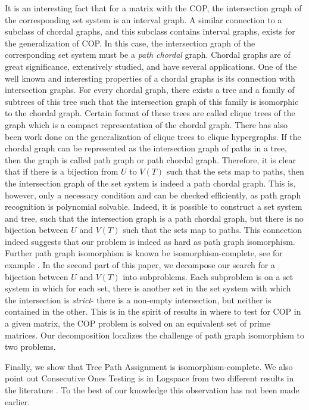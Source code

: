 \documentclass{llncs}
\begin{document}
\noindent
It is an interesting fact that for a matrix with the COP, the intersection graph of the corresponding set system is
an interval graph.  A similar connection to a subclass of chordal graphs, and this subclass contains interval graphs, exists for the generalization of COP.  In this case, the intersection graph of the corresponding set system must be a
{\em path chordal} graph. Chordal
graphs are of great significance, extensively studied, and have several applications.
 One of
the well known and interesting properties of a chordal graphs is its
connection with intersection graphs\cite{mcg04}. For every chordal
graph, there exists a tree and a family of subtrees of this tree such
that the intersection graph of this family is isomorphic to the
chordal graph\cite{plr70,gav78,bp93}.  Certain format of these trees are called clique
trees\cite{apy92} of the graph which is a compact representation of the
chordal graph. There has also been work done on the generalization of
clique trees to clique hypergraphs\cite{km02}.  If the chordal graph can be represented as
the intersection graph of paths in a tree, then the graph is called  path graph\cite{mcg04} or path
chordal graph.  Therefore, it is clear that if there is a bijection from $U$ to $V(T)$ such that
the sets map to paths, then the intersection graph of the set system is indeed a path chordal graph.
This is, however, only a necessary condition and can be checked efficiently, as  path graph recognition is polynomial
solvable\cite{gav78,aas93}.  Indeed, it is possible to construct a set system and tree, such that
the intersection graph is a path chordal graph, but there is no bijection between $U$ and $V(T)$ such that
the sets map to paths.   This connection indeed suggests that our problem is indeed as hard as path graph 
isomorphism.   Further path graph isomorphism is known be isomorphism-complete, see for example \cite{kklv10}.  In the second part of this paper, we decompose our search for a bijection between $U$ and $V(T)$ into subproblems.  Each subproblem is on a set system in which for each set, there is another set in the set system with which the intersection is {\em strict}- there is a non-empty intersection, but neither is contained in the other.  This is in the spirit of results in \cite{wlh02,nsnrs09} where to test for COP in a given matrix, the COP problem is solved on an equivalent set of prime matrices.  Our decomposition localizes the challenge of path graph isomorphism to two problems.  

Finally, we show that Tree Path Assignment is isomorphism-complete.  We also point out Consecutive Ones Testing is in Logspace from two different results in the literature \cite{kklv10, mcc04}. To the best of our knowledge this observation has not been made earlier.  
\end{document}
